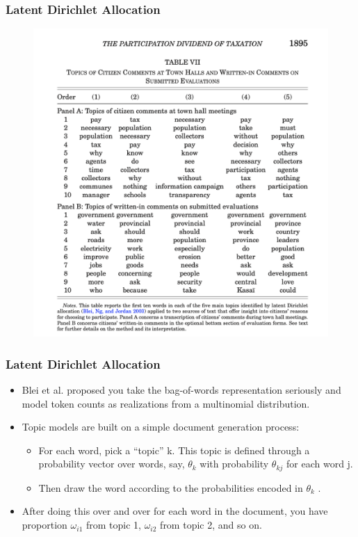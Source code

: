 \documentclass[
  shownotes,
  xcolor={svgnames},
  hyperref={colorlinks,citecolor=DarkBlue,linkcolor=DarkRed,urlcolor=DarkBlue}
  , aspectratio=169]{beamer}
\begin{document}
\begin{frame}
\frametitle{Latent Dirichlet Allocation}

\begin{figure}[H] \centering
            \captionsetup{justification=centering}
              \includegraphics[scale=0.4]{figures/weigel2.png}
              
 \end{figure}


\end{frame}
\begin{frame}
\frametitle{Latent Dirichlet Allocation}

\begin{itemize}
\item Blei et al. proposed you take the bag-of-words representation seriously and model token counts as realizations from a multinomial distribution. 

\medskip
\item Topic models are built on a simple document generation process: 
\medskip
\begin{itemize}

\item  For each word, pick a “topic” k. This topic is defined through a probability vector over words, say, $\theta_k$ with probability $\theta_{kj}$ for each word j. 
\medskip
\item Then draw the word according to the probabilities encoded in $\theta_k$ . 
\medskip
\end{itemize}
\item After doing this over and over for each word in the document, you have proportion $\omega_{i1}$ from topic 1, $\omega_{i2}$ from topic 2, and so on. 

\end{itemize}
\end{frame}
\end{document}
